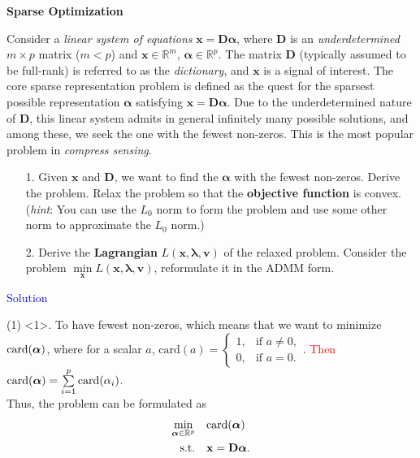 \item[\uppercase\expandafter{\romannumeral2}.]\textbf{Sparse Optimization}

Consider a \textit{linear system of equations} $\mathbf{x} = \mathbf{D}\boldsymbol{\alpha}$, where $\mathbf{D}$ is an \textit{underdetermined} $m \times p$ matrix ($m < p$) and $\mathbf{x} \in \mathbb{R}^m$, $\boldsymbol{\alpha} \in \mathbb{R}^p$. The matrix $\mathbf{D}$ (typically assumed to be full-rank) is referred to as the \textit{dictionary}, and $\mathbf{x}$ is a signal of interest. The core sparse representation problem is defined as the quest for the sparsest possible representation $\boldsymbol{\alpha}$ satisfying $\mathbf{x} = \mathbf{D}\boldsymbol{\alpha}$. Due to the underdetermined nature of $\mathbf{D}$, this linear system admits in general infinitely many possible solutions, and among these, we seek the one with the fewest non-zeros. This is the most popular problem in \emph{compress sensing}.
\begin{itemize}
\item[1.]
Given $\mathbf{x}$ and $\mathbf{D}$, we want to find the $\boldsymbol{\alpha}$ with the fewest non-zeros. Derive the problem.  Relax the problem so that the \textbf{objective function} is convex.  (\emph{hint}: You can use the $L_0$ norm to form the problem and use some other norm to approximate the $L_0$ norm.)

\item[2.] Derive the \textbf{Lagrangian} $L(\mathbf{x}, \mathbf{\lambda}, \mathbf{v})$ of the relaxed problem.  Consider the problem $\min\limits_{\mathbf{x}} L(\mathbf{x}, \mathbf{\lambda}, \mathbf{v})$, reformulate it in the ADMM form. 
\end{itemize}

\textcolor{blue}{Solution}

(1) <1>. To have fewest non-zeros, which means that we want to minimize $\text{card}(\boldsymbol{\alpha})$, where for a scalar $a$, $\text{card}(a) = \begin{cases}
1, & \text{if } a \neq 0, \\
0, & \text{if } a = 0.
\end{cases}$. \textcolor{red}{Then $\text{card}(\boldsymbol{\alpha}) = \sum\limits_{i=1}^p\text{card}(\alpha_i)$.} \\
Thus, the problem can be formulated as
\begin{align*}
\min_{\boldsymbol{\alpha}\in\mathbb{R}^p} & \quad \text{card}(\boldsymbol{\alpha}) \\
\text{s.t.} & \quad \mathbf{x} = \mathbf{D}\boldsymbol{\alpha}.
\end{align*}

